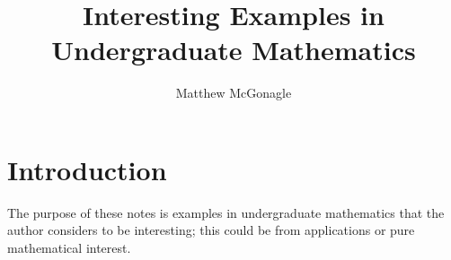 \documentclass{article}
\title{Interesting Examples in Undergraduate Mathematics}
\author{Matthew McGonagle}
\begin{document}
\maketitle

\tableofcontents

\section{Introduction}

The purpose of these notes is examples in undergraduate mathematics that the author considers to be interesting; this could be from applications or pure mathematical interest. 








{}

\end{document}
